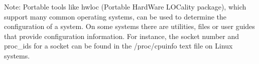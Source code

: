 Note: Portable tools like hwloc (Portable HardWare LOCality package), which support
many common operating systems, can be used to determine the configuration of a system.  
On some systems there are utilities, files or user guides that provide configuration
information.  For instance, the socket number and proc\_ids for a socket 
can be found in the /proc/cpuinfo text file on Linux systems.




